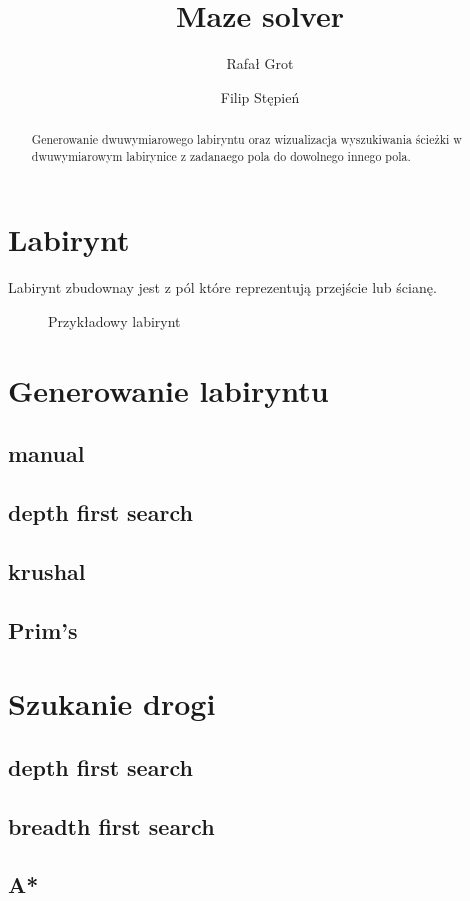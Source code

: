 \documentclass{article}
\title{Maze solver}
\author{Rafał Grot \and Filip Stępień}
\begin{document}
\maketitle

\begin{abstract}
  Generowanie dwuwymiarowego labiryntu oraz wizualizacja wyszukiwania ścieżki w dwuwymiarowym labirynice z zadanaego pola do dowolnego innego pola.
\end{abstract}

\newcommand{\GridWidth}{8}   %
\newcommand{\GridHeight}{6}  %


\section{Labirynt}

Labirynt zbudownay jest z pól które reprezentują przejście lub ścianę.

\begin{figure}[ht]
  \begin{center}
    
  \end{center}
  \caption{Przykładowy labirynt}
\end{figure}

\faUser
{}

\section{Generowanie labiryntu}
\subsection{manual}
\subsection{depth first search}
\subsection{krushal}
\subsection{Prim's}

\section{Szukanie drogi}
\subsection{depth first search}
\subsection{breadth first search}
\subsection{A*}
\end{document}

